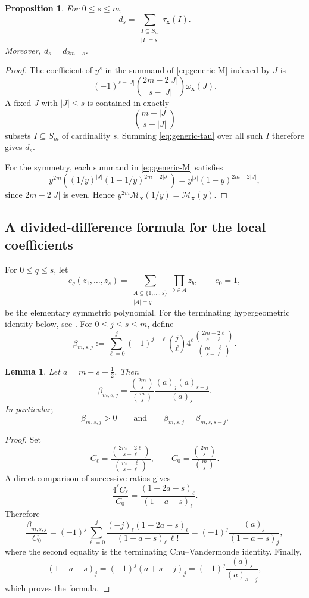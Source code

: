 \documentclass[10pt,a4paper]{amsart}
\newtheorem{Lemma}[Theorem]{Lemma}
\newtheorem{Proposition}[Theorem]{Proposition}
\theoremstyle{definition}
\begin{document}
\begin{Proposition}\label{prop:generic-localization}
For $0\le s\le m$,
\[
d_s
=
\sum_{\substack{I\subseteq S_m\\|I|=s}}
\tau_{\mathbf x}(I).
\]
Moreover, $d_s=d_{2m-s}$.
\end{Proposition}

\begin{proof}
The coefficient of $y^s$ in the summand of \eqref{eq:generic-M} indexed by
$J$ is
\[
(-1)^{s-|J|}
\binom{2m-2|J|}{s-|J|}
\omega_{\mathbf x}(J).
\]
A fixed $J$ with $|J|\le s$ is contained in exactly
\[
\binom{m-|J|}{s-|J|}
\]
subsets $I\subseteq S_m$ of cardinality $s$.  Summing
\eqref{eq:generic-tau} over all such $I$ therefore gives $d_s$.

For the symmetry, each summand in \eqref{eq:generic-M} satisfies
\[
y^{2m}
\left(
(1/y)^{|J|}(1-1/y)^{2m-2|J|}
\right)
=
y^{|J|}(1-y)^{2m-2|J|},
\]
since $2m-2|J|$ is even.  
Hence $y^{2m}\mathcal M_{\mathbf x}(1/y)=\mathcal M_{\mathbf x}(y)$.
\end{proof}


\subsection{A divided-difference formula for the local coefficients}\label{sec:local-dd}

For $0\le q\le s$, let
\[
e_q(z_1,\ldots,z_s)
=
\sum_{\substack{A\subseteq\{1,\ldots,s\}\\|A|=q}}
\prod_{b\in A}z_b,
\qquad
e_0=1,
\]
be the elementary symmetric polynomial.  
For the terminating hypergeometric identity below, see
\cite[Chapter~2]{AndrewsAskeyRoy}.
For $0\le j\le s\le m$, define
\[
\beta_{m,s,j}
:=
\sum_{\ell=0}^j
(-1)^{j-\ell}\binom{j}{\ell}4^\ell
\frac{\binom{2m-2\ell}{s-\ell}}
{\binom{m-\ell}{s-\ell}}.
\]

\begin{Lemma}\label{lem:beta-identity}
Let $a=m-s+\frac12$.
Then
\[
\beta_{m,s,j}
=
\frac{\binom{2m}{s}}{\binom{m}{s}}
\frac{(a)_j(a)_{s-j}}{(a)_s}.
\]
In particular,
\[
\beta_{m,s,j}>0
\qquad\text{and}\qquad
\beta_{m,s,j}=\beta_{m,s,s-j}.
\]
\end{Lemma}

\begin{proof}
Set
\[
C_\ell
=
\frac{\binom{2m-2\ell}{s-\ell}}
{\binom{m-\ell}{s-\ell}},
\qquad
C_0=\frac{\binom{2m}{s}}{\binom{m}{s}}.
\]
A direct comparison of successive ratios gives
\[
\frac{4^\ell C_\ell}{C_0}
=
\frac{(1-2a-s)_\ell}{(1-a-s)_\ell}.
\]
Therefore
\[
\frac{\beta_{m,s,j}}{C_0}
=
(-1)^j
\sum_{\ell=0}^j
\frac{(-j)_\ell(1-2a-s)_\ell}
{(1-a-s)_\ell\,\ell!}
=
(-1)^j\frac{(a)_j}{(1-a-s)_j},
\]
where the second equality is the terminating Chu--Vandermonde identity.
Finally,
\[
(1-a-s)_j
=
(-1)^j(a+s-j)_j
=
(-1)^j\frac{(a)_s}{(a)_{s-j}},
\]
which proves the formula.
\end{proof}
\end{document}
